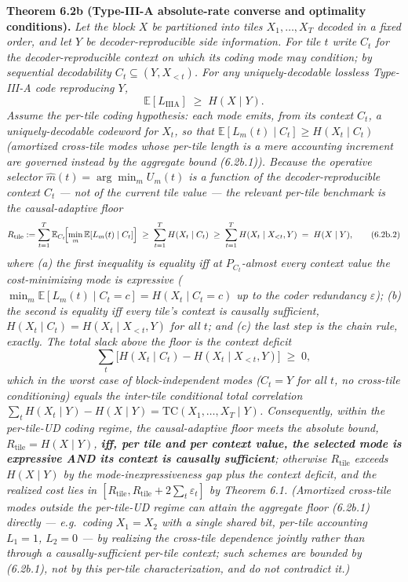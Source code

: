\documentclass[
]{article}
\begin{document}
\textbf{Theorem 6.2b (Type-III-A absolute-rate converse and optimality
conditions).} \emph{Let the block $X$ be partitioned into tiles
$X_1,\ldots,X_T$ decoded in a fixed order, and let $Y$ be
decoder-reproducible side information. For tile $t$ write $C_t$ for the
decoder-reproducible context on which its coding mode may condition; by
sequential decodability $C_t \subseteq (Y, X_{<t})$. For any
uniquely-decodable lossless Type-III-A code reproducing $Y$,}
\[
\mathbb{E}[L_{\mathrm{IIIA}}] \;\ge\; H(X \mid Y).
\tag{6.2b.1}
\]
\emph{Assume the \emph{per-tile coding hypothesis}: each mode emits, from
its context $C_t$, a uniquely-decodable codeword for $X_t$, so that
$\mathbb{E}[L_m(t) \mid C_t] \ge H(X_t \mid C_t)$ (amortized cross-tile
modes whose per-tile length is a mere accounting increment are governed
instead by the aggregate bound (6.2b.1)). Because the operative selector
$\hat m(t) = \arg\min_m U_m(t)$ is a function of the decoder-reproducible
context $C_t$ --- not of the current tile value --- the relevant per-tile
benchmark is the \emph{causal-adaptive floor}}
\[
R_{\mathrm{tile}}
:= \sum_{t=1}^{T} \mathbb{E}_{C_t}\!\Bigl[\min_{m}
   \mathbb{E}[L_m(t) \mid C_t]\Bigr]
\;\ge\; \sum_{t=1}^{T} H(X_t \mid C_t)
\;\ge\; \sum_{t=1}^{T} H(X_t \mid X_{<t}, Y)
\;=\; H(X \mid Y),
\tag{6.2b.2}
\]
\emph{where (a) the first inequality is equality iff at $P_{C_t}$-almost
every context value the cost-minimizing mode is \emph{expressive}
($\min_m \mathbb{E}[L_m(t)\mid C_t{=}c] = H(X_t \mid C_t{=}c)$ up to the
coder redundancy $\varepsilon$); (b) the second is equality iff every
tile's context is \emph{causally sufficient},
$H(X_t \mid C_t) = H(X_t \mid X_{<t}, Y)$ for all $t$; and (c) the last
step is the chain rule, exactly. The total slack above the floor is the
\emph{context deficit}}
\[
\sum_{t} \bigl[ H(X_t \mid C_t) - H(X_t \mid X_{<t}, Y) \bigr]
\;\ge\; 0,
\tag{6.2b.3}
\]
\emph{which in the worst case of \emph{block-independent} modes
($C_t = Y$ for all $t$, no cross-tile conditioning) equals the
inter-tile conditional total correlation $\sum_t H(X_t \mid Y) -
H(X \mid Y) = \mathrm{TC}(X_1,\ldots,X_T \mid Y)$. Consequently, within
the per-tile-UD coding regime, the causal-adaptive floor meets the
absolute bound, $R_{\mathrm{tile}} = H(X\mid Y)$, \textbf{iff, per tile
and per context value, the selected mode is expressive AND its context
is causally sufficient}; otherwise $R_{\mathrm{tile}}$ exceeds
$H(X\mid Y)$ by the mode-inexpressiveness gap plus the context deficit,
and the realized cost lies in $[R_{\mathrm{tile}}, R_{\mathrm{tile}} +
2\sum_t \varepsilon_t]$ by Theorem 6.1. (Amortized cross-tile modes
\emph{outside} the per-tile-UD regime can attain the aggregate floor
(6.2b.1) directly --- e.g.\ coding $X_1 = X_2$ with a single shared bit,
per-tile accounting $L_1 = 1$, $L_2 = 0$ --- by realizing the cross-tile
dependence jointly rather than through a causally-sufficient per-tile
context; such schemes are bounded by (6.2b.1), not by this per-tile
characterization, and do not contradict it.)}
\end{document}
